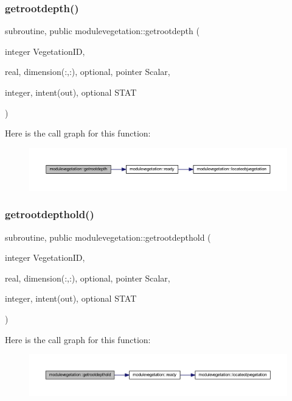 \subsubsection{\texorpdfstring{getrootdepth()}{getrootdepth()}}
{\footnotesize\ttfamily subroutine, public modulevegetation\+::getrootdepth (\begin{DoxyParamCaption}\item[{integer}]{Vegetation\+ID,  }\item[{real, dimension(\+:,\+:), optional, pointer}]{Scalar,  }\item[{integer, intent(out), optional}]{S\+T\+AT }\end{DoxyParamCaption})}

Here is the call graph for this function\+:\nopagebreak
\begin{figure}[H]
\begin{center}
\leavevmode
\includegraphics[width=350pt]{namespacemodulevegetation_a4eb34f9d9a6f4daecca56ea8f69b25b3_cgraph}
\end{center}
\end{figure}
\mbox{\label{namespacemodulevegetation_a09efc99ad0002ea520622c460b1b067d}} 
\subsubsection{\texorpdfstring{getrootdepthold()}{getrootdepthold()}}
{\footnotesize\ttfamily subroutine, public modulevegetation\+::getrootdepthold (\begin{DoxyParamCaption}\item[{integer}]{Vegetation\+ID,  }\item[{real, dimension(\+:,\+:), optional, pointer}]{Scalar,  }\item[{integer, intent(out), optional}]{S\+T\+AT }\end{DoxyParamCaption})}

Here is the call graph for this function\+:\nopagebreak
\begin{figure}[H]
\begin{center}
\leavevmode
\includegraphics[width=350pt]{namespacemodulevegetation_a09efc99ad0002ea520622c460b1b067d_cgraph}
\end{center}
\end{figure}
\mbox{\label{namespacemodulevegetation_aefe8dd6c224ba5b203b6c1be059d23e7}} 
